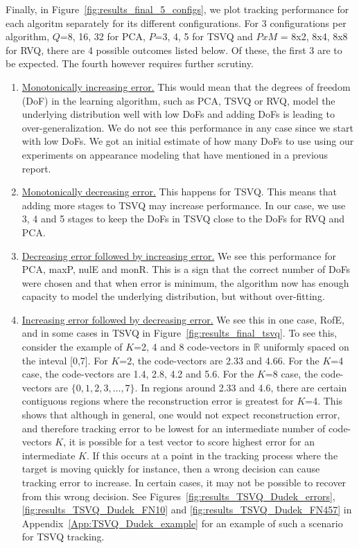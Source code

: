 Finally, in Figure~\ref{fig:results_final_5_configs}, we plot tracking performance for each algoritm separately for its different configurations.  For 3 configurations per algorithm, $Q$=8, 16, 32 for PCA, $P$=3, 4, 5 for TSVQ and $PxM$ = 8x2, 8x4, 8x8 for RVQ, there are 4 possible outcomes listed below.  Of these, the first 3 are to be expected.  The fourth however requires further scrutiny.

\begin{enumerate}
\item \underline{Monotonically increasing error.}  This would mean that the degrees of freedom (DoF) in the learning algorithm, such as PCA, TSVQ or RVQ, model the underlying distribution well with low DoFs and adding DoFs is leading to over-generalization.  We do not see this performance in any case since we start with low DoFs.  We got an initial estimate of how many DoFs to use using our experiments on appearance modeling that have mentioned in a previous report.
\item \underline{Monotonically decreasing error.}  This happens for TSVQ.  This means that adding more stages to TSVQ may increase performance.  In our case, we use 3, 4 and 5 stages to keep the DoFs in TSVQ close to the DoFs for RVQ and PCA.
\item \underline{Decreasing error followed by increasing error.}  We see this performance for PCA, maxP, nulE and monR.  This is a sign that the correct number of DoFs were chosen and that when error is minimum, the algorithm now has enough capacity to model the underlying distribution, but without over-fitting.
\item \underline{Increasing error followed by decreasing error.}  We see this in one case, RofE, and in some cases in TSVQ in Figure~\ref{fig:results_final_tsvq}.  To see this, consider the example of $K$=2, 4 and 8 code-vectors in $\mathbb{R}$ uniformly spaced on the inteval [0,7].  For $K$=2, the code-vectors are 2.33 and 4.66.  For the $K$=4 case, the code-vectors are 1.4, 2.8, 4.2 and 5.6.  For the $K$=8 case, the code-vectors are $\{0, 1, 2, 3, \ldots, 7\}$.  In regions around 2.33 and 4.6, there are certain contiguous regions where the reconstruction error is greatest for $K$=4.  This shows that although in general, one would not expect reconstruction error, and therefore tracking error to be lowest for an intermediate number of code-vectors $K$, it is possible for a test vector to score highest error for an intermediate $K$.  If this occurs at a point in the tracking process where the target is moving quickly for instance, then a wrong decision can cause tracking error to increase.  In certain cases, it may not be possible to recover from this wrong decision.  See Figures~\ref{fig:results_TSVQ_Dudek_errors}, \ref{fig:results_TSVQ_Dudek_FN10} and \ref{fig:results_TSVQ_Dudek_FN457} in Appendix~\ref{App:TSVQ_Dudek_example} for an example of such a scenario for TSVQ tracking.


\end{enumerate}

